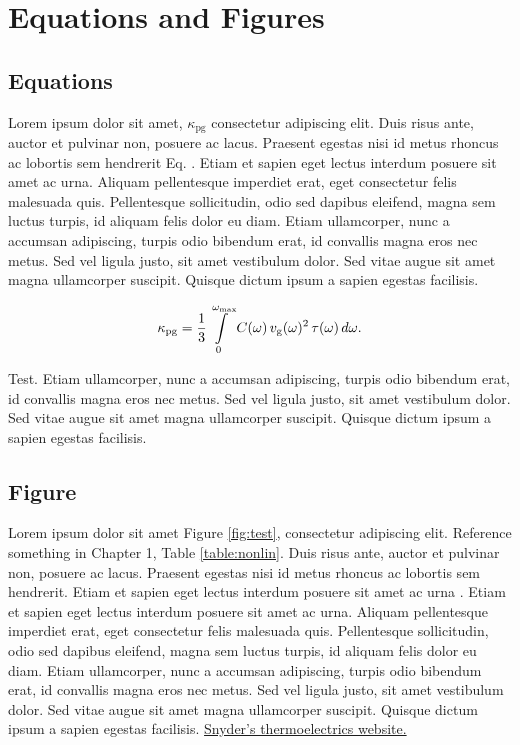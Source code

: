 \chapter{Equations and Figures }

\section{Equations}
Lorem ipsum dolor sit amet, $\kappa_\mathrm{pg}$
consectetur adipiscing elit. Duis risus ante, auctor et pulvinar non, posuere ac lacus. Praesent egestas nisi id metus rhoncus ac lobortis sem hendrerit Eq. . Etiam et sapien eget lectus interdum posuere sit amet ac urna. Aliquam pellentesque imperdiet erat, eget consectetur felis malesuada quis. Pellentesque sollicitudin, odio sed dapibus eleifend, magna sem luctus turpis, id aliquam felis dolor eu diam. Etiam ullamcorper, nunc a accumsan adipiscing, turpis odio bibendum erat, id convallis magna eros nec metus. Sed vel ligula justo, sit amet vestibulum dolor. Sed vitae augue sit amet magna ullamcorper suscipit. Quisque dictum ipsum a sapien egestas facilisis.

\begin{equation}
  \kappa_\mathrm{pg}=\frac{1}{3} \intop _0 ^{\omega_\mathrm{max}} C(\omega) \, v_\mathrm{g}(\omega)^2 \, \tau(\omega) \, d\omega. \label{eq:Callaway}
\end{equation}

Test. Etiam ullamcorper, nunc a accumsan adipiscing, turpis odio bibendum erat, id convallis magna eros nec metus. Sed vel ligula justo, sit amet vestibulum dolor. Sed vitae augue sit amet magna ullamcorper suscipit. Quisque dictum ipsum a sapien egestas facilisis. 

\section{Figure}
\noindent Lorem ipsum dolor sit amet Figure \ref{fig:test}, consectetur adipiscing elit. Reference something in Chapter 1, Table \ref{table:nonlin}. Duis risus ante, auctor et pulvinar non, posuere ac lacus. Praesent egestas nisi id metus rhoncus ac lobortis sem hendrerit. Etiam et sapien eget lectus interdum posuere sit amet ac urna \citep{latex:companion}. Etiam et sapien eget lectus interdum posuere sit amet ac urna. Aliquam pellentesque imperdiet erat, eget consectetur felis malesuada quis. Pellentesque sollicitudin, odio sed dapibus eleifend, magna sem luctus turpis, id aliquam felis dolor eu diam. Etiam ullamcorper, nunc a accumsan adipiscing, turpis odio bibendum erat, id convallis magna eros nec metus. Sed vel ligula justo, sit amet vestibulum dolor. Sed vitae augue sit amet magna ullamcorper suscipit. Quisque dictum ipsum a sapien egestas facilisis. \href{http://thermoelectrics.matsci.northwestern.edu/}{Snyder's thermoelectrics website.}

